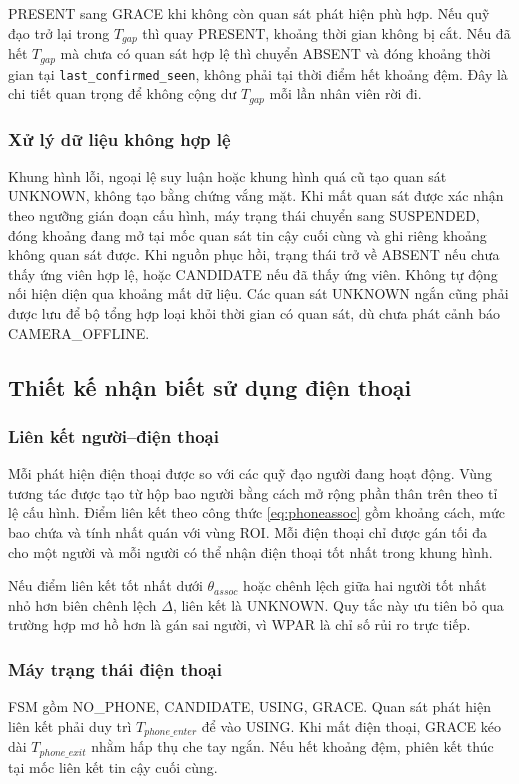 PRESENT sang GRACE khi không còn quan sát phát hiện phù hợp. Nếu quỹ đạo trở lại trong $T_{gap}$ thì quay PRESENT, khoảng thời gian không bị cắt. Nếu đã hết $T_{gap}$ mà chưa có quan sát hợp lệ thì chuyển ABSENT và đóng khoảng thời gian tại \texttt{last\_confirmed\_seen}, không phải tại thời điểm hết khoảng đệm. Đây là chi tiết quan trọng để không cộng dư $T_{gap}$ mỗi lần nhân viên rời đi.

\subsubsection{Xử lý dữ liệu không hợp lệ}
Khung hình lỗi, ngoại lệ suy luận hoặc khung hình quá cũ tạo quan sát UNKNOWN, không tạo bằng chứng vắng mặt. Khi mất quan sát được xác nhận theo ngưỡng gián đoạn cấu hình, máy trạng thái chuyển sang SUSPENDED, đóng khoảng đang mở tại mốc quan sát tin cậy cuối cùng và ghi riêng khoảng không quan sát được. Khi nguồn phục hồi, trạng thái trở về ABSENT nếu chưa thấy ứng viên hợp lệ, hoặc CANDIDATE nếu đã thấy ứng viên. Không tự động nối hiện diện qua khoảng mất dữ liệu. Các quan sát UNKNOWN ngắn cũng phải được lưu để bộ tổng hợp loại khỏi thời gian có quan sát, dù chưa phát cảnh báo CAMERA\_OFFLINE.

\subsection{Thiết kế nhận biết sử dụng điện thoại}
\subsubsection{Liên kết người--điện thoại}
Mỗi phát hiện điện thoại được so với các quỹ đạo người đang hoạt động. Vùng tương tác được tạo từ hộp bao người bằng cách mở rộng phần thân trên theo tỉ lệ cấu hình. Điểm liên kết theo công thức \ref{eq:phoneassoc} gồm khoảng cách, mức bao chứa và tính nhất quán với vùng ROI. Mỗi điện thoại chỉ được gán tối đa cho một người và mỗi người có thể nhận điện thoại tốt nhất trong khung hình.

Nếu điểm liên kết tốt nhất dưới $\theta_{assoc}$ hoặc chênh lệch giữa hai người tốt nhất nhỏ hơn biên chênh lệch $\Delta$, liên kết là UNKNOWN. Quy tắc này ưu tiên bỏ qua trường hợp mơ hồ hơn là gán sai người, vì WPAR là chỉ số rủi ro trực tiếp.

\subsubsection{Máy trạng thái điện thoại}
FSM gồm NO\_PHONE, CANDIDATE, USING, GRACE. Quan sát phát hiện liên kết phải duy trì $T_{phone\_enter}$ để vào USING. Khi mất điện thoại, GRACE kéo dài $T_{phone\_exit}$ nhằm hấp thụ che tay ngắn. Nếu hết khoảng đệm, phiên kết thúc tại mốc liên kết tin cậy cuối cùng.

